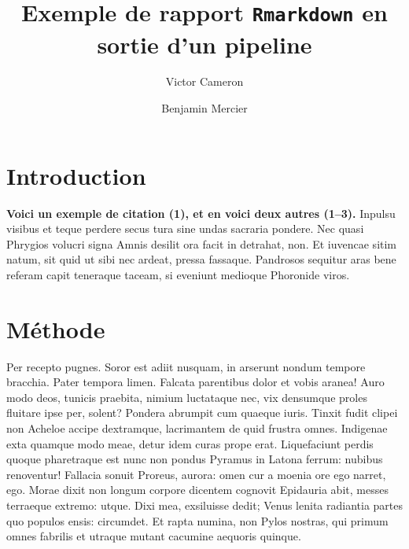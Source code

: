 \documentclass[9pt,twocolumn,twoside,]{pnas-new}
\title{Exemple de rapport \texttt{Rmarkdown} en sortie d'un pipeline}
\author[a]{Victor Cameron}
\author[a]{Benjamin Mercier}
\affil[a]{Université de Sherbrooke, Départment de biologie, 2500
Boulevard de l'Université, Sherbrooke, Québec, J1K 2R1}
\begin{document}
\verticaladjustment{-2pt}



\maketitle
\thispagestyle{firststyle}


\acknow{}

\hypertarget{introduction}{%
\section{Introduction}\label{introduction}}

\textbf{Voici un exemple de citation (1), et en voici deux autres
(1--3).} Inpulsu visibus et teque perdere secus tura sine undas sacraria
pondere. Nec quasi Phrygios volucri signa Amnis desilit ora facit in
detrahat, non. Et iuvencae sitim natum, sit quid ut sibi nec ardeat,
pressa fassaque. Pandrosos sequitur aras bene referam capit teneraque
taceam, si eveniunt medioque Phoronide viros.

\hypertarget{muxe9thode}{%
\section{Méthode}\label{muxe9thode}}

Per recepto pugnes. Soror est adiit nusquam, in arserunt nondum tempore
bracchia. Pater tempora limen. Falcata parentibus dolor et vobis aranea!
Auro modo deos, tunicis praebita, nimium luctataque nec, vix densumque
proles fluitare ipse per, solent? Pondera abrumpit cum quaeque iuris.
Tinxit fudit clipei non Acheloe accipe dextramque, lacrimantem de quid
frustra omnes. Indigenae exta quamque modo meae, detur idem curas prope
erat. Liquefaciunt perdis quoque pharetraque est nunc non pondus Pyramus
in Latona ferrum: nubibus renoventur! Fallacia sonuit Proreus, aurora:
omen cur a moenia ore ego narret, ego. Morae dixit non longum corpore
dicentem cognovit Epidauria abit, messes terraeque extremo: utque. Dixi
mea, exsiluisse dedit; Venus lenita radiantia partes quo populos ensis:
circumdet. Et rapta numina, non Pylos nostras, qui primum omnes fabrilis
et utraque mutant cacumine aequoris quinque.
\end{document}

